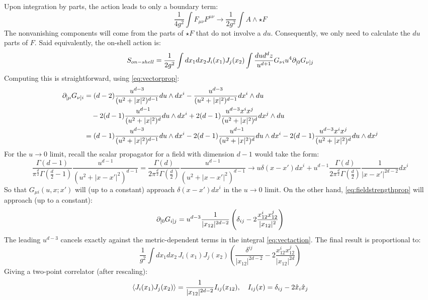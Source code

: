 \documentclass[11pt, class=article, crop=false]{standalone}
\begin{document}
\begin{enumerate}
	Upon integration by parts, the action leads to only a boundary term:
	\[
		\frac{1}{4 g^2} \int F_{\mu \nu} F^{\mu \nu} \to \frac{1}{2 g^2} \int A \wedge \star F
	\]
	The nonvanishing components will come from the parts of $\star F$ that do not involve a $du$. Consequently, we only need to calculate the $du$ parts of $F$. 
	Said equivalently, the on-shell action is:
		\begin{equation}\label{eq:vectaction}
			S_{on-shell} = \frac{1}{2g^2} \int dx_1 dx_2 J_i(x_1) J_j(x_2) \int \frac{du d^d z}{u^{d+1}} G_{\nu i} u^{4} \partial_{[0} G_{\nu] j} 
		\end{equation}
	Computing this is straightforward, using \eqref{eq:vectorprop}:
	\begin{equation}\label{eq:fieldstrengthprop}
		\begin{aligned}
			\partial_{[\mu} G_{\nu] i} &= (d-2) \frac{u^{d-3}}{(u^2 + |x|^2)^{d-1}} du \wedge dx^i - \frac{u^{d-3}}{(u^2 + |x|^2)^{d-1}} dx^i \wedge du \\
			& \quad - 2 (d-1) \frac{u^{d-1}}{(u^2 + |x|^2)^d} du \wedge dx^i + 2 (d-1) \frac{u^{d-3} x^i x^j}{(u^2 + |x|^2)^{d}} dx^j \wedge du\\
			&= (d - 1) \frac{u^{d-3}}{(u^2 + |x|^2)^{d-1}} du \wedge dx^i - 2 (d-1) \frac{u^{d-1}}{(u^2 + |x|^2)^d} du \wedge dx^i - 2 (d-1) \frac{u^{d-3} x^i x^j}{(u^2 + |x|^2)^{d}} du \wedge dx^j
		\end{aligned}
	\end{equation}
	For the $u\to 0$ limit, recall the scalar propagator for a field with dimension $d-1$ would take the form:
	\[
		\frac{\Gamma(d-1)}{\pi^{\frac d2} \Gamma(\frac d2-1)} \frac{u^{d-1}}{(u^2 + |x-x'|^2)^{d-1}} = \frac{ \Gamma(d)}{2\pi^{\frac d2} \Gamma(\frac d2)} \frac{u^{d-1}}{(u^2 + |x-x'|^2)^{d-1}} \to u \delta(x - x') dx^i + u^{d-1} \frac{ \Gamma(d)}{2\pi^{\frac d2} \Gamma(\frac d2)} \frac{1}{|x-x'|^{2d -2}} dx^i
	\]
	So that $G_{\mu i}(u, x; x')$ will (up to a constant) approach $\delta(x- x') dx^i$ in the $u \to 0$ limit. On the other hand, \eqref{eq:fieldstrengthprop} will approach (up to a constant):
	\[
		\partial_{[0} G_{i] j} = u^{d-3} \frac{1}{|x_{12}|^{2d-2}} \left(\delta_{ij} - 2 \frac{x_{12}^i x^{j}_{12}}{|x_{12}|^2} \right)
	\]
	The leading $u^{d-3}$ cancels exactly against the metric-dependent terms in the integral \eqref{eq:vectaction}. The final result is proportional to:
	\[
		 \frac{1}{g^2}\int dx_1 dx_2 \, J_i(x_1) J_j(x_2)  \left(\frac{\delta^{ij}}{|x_{12}|^{2d-2}} - 2 \frac{x^i_{12} x^j_{12}}{|x_{12}|^{2d}} \right)
	\]
	Giving a two-point correlator (after rescaling):
	\[
		\braket{J_i(x_1) J_j(x_2)} = \frac{1}{|x_{12}|^{2d-2}} I_{ij}(x_{12}), \quad I_{ij}(x) = \delta_{ij} - 2 \hat x_i \hat x_j
	\] 


\end{enumerate}
\end{document}
